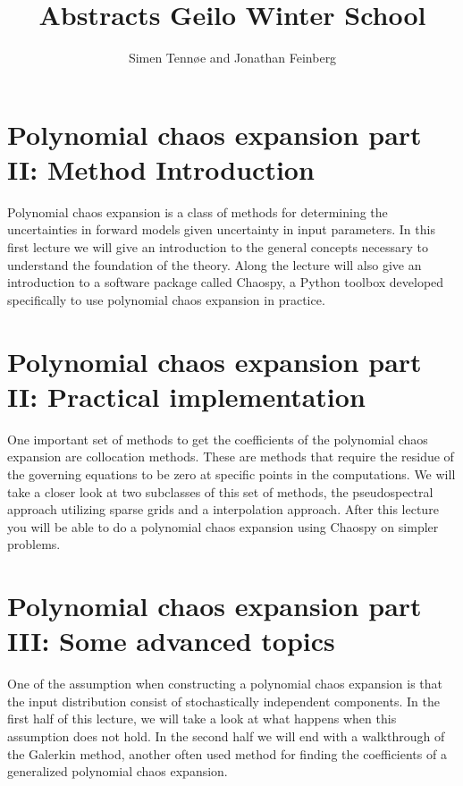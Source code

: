 \documentclass[a4paper,10pt]{article}
\title{Abstracts Geilo Winter School}
\author{Simen Tennøe and Jonathan Feinberg}
\begin{document}
\maketitle
\newpage


\section{Polynomial chaos expansion part II: Method Introduction}

Polynomial chaos expansion is a class of methods for determining the
uncertainties in forward models given uncertainty in input parameters.
In this first lecture we will give an introduction to the general
concepts necessary to understand the foundation of the theory.
Along the lecture will also give an introduction to a software
package called Chaospy, a Python toolbox developed specifically to
use polynomial chaos expansion in practice.



\section{Polynomial chaos expansion part II: Practical implementation}
One important set of methods to get the coefficients of the
polynomial chaos expansion are collocation methods.
These are methods that require the residue of the governing
equations to be zero at specific points in the computations.
We will take a closer look at two subclasses of this set of
methods, the pseudospectral approach utilizing sparse grids and a
interpolation approach.  After this lecture you will be able to do
a polynomial chaos expansion using Chaospy on simpler problems.




\section{Polynomial chaos expansion part III: Some advanced topics}
One of the assumption when constructing a polynomial chaos
expansion is that the input distribution consist of stochastically
independent components.
In the first half of this lecture, we will take a look at what
happens when this assumption does not hold.
In the second half we will end with a walkthrough of the Galerkin
method, another often used method for finding the coefficients of a
generalized polynomial chaos expansion.
\end{document}
